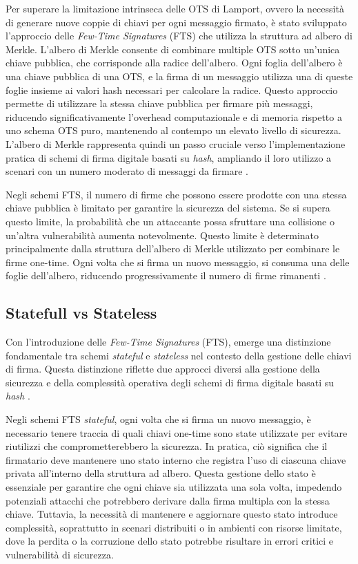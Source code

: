 Per superare la limitazione intrinseca delle OTS di Lamport, ovvero la necessità di generare nuove coppie di chiavi per ogni messaggio firmato, è stato sviluppato l'approccio delle \textit{Few-Time Signatures} (FTS) che utilizza la struttura ad albero di Merkle. L'albero di Merkle consente di combinare multiple OTS sotto un'unica chiave pubblica, che corrisponde alla radice dell'albero. Ogni foglia dell'albero è una chiave pubblica di una OTS, e la firma di un messaggio utilizza una di queste foglie insieme ai valori hash necessari per calcolare la radice. Questo approccio permette di utilizzare la stessa chiave pubblica per firmare più messaggi, riducendo significativamente l'overhead computazionale e di memoria rispetto a uno schema OTS puro, mantenendo al contempo un elevato livello di sicurezza. L'albero di Merkle rappresenta quindi un passo cruciale verso l'implementazione pratica di schemi di firma digitale basati su \textit{hash}, ampliando il loro utilizzo a scenari con un numero moderato di messaggi da firmare \cite{nature-pqc}.

Negli schemi FTS, il numero di firme che possono essere prodotte con una stessa chiave pubblica è limitato per garantire la sicurezza del sistema. Se si supera questo limite, la probabilità che un attaccante possa sfruttare una collisione o un'altra vulnerabilità aumenta notevolmente. Questo limite è determinato principalmente dalla struttura dell'albero di Merkle utilizzato per combinare le firme one-time. Ogni volta che si firma un nuovo messaggio, si consuma una delle foglie dell'albero, riducendo progressivamente il numero di firme rimanenti \cite{nature-pqc}.

\subsection{Statefull vs Stateless}

Con l'introduzione delle \textit{Few-Time Signatures} (FTS), emerge una distinzione fondamentale tra schemi \textit{stateful} e \textit{stateless} nel contesto della gestione delle chiavi di firma. Questa distinzione riflette due approcci diversi alla gestione della sicurezza e della complessità operativa degli schemi di firma digitale basati su \textit{hash} \cite{iot-hashbasedpqc}.

Negli schemi FTS  \textit{stateful}, ogni volta che si firma un nuovo messaggio, è necessario tenere traccia di quali chiavi one-time sono state utilizzate per evitare riutilizzi che comprometterebbero la sicurezza. In pratica, ciò significa che il firmatario deve mantenere uno stato interno che registra l'uso di ciascuna chiave privata all'interno della struttura ad albero. Questa gestione dello stato è essenziale per garantire che ogni chiave sia utilizzata una sola volta, impedendo potenziali attacchi che potrebbero derivare dalla firma multipla con la stessa chiave. Tuttavia, la necessità di mantenere e aggiornare questo stato introduce complessità, soprattutto in scenari distribuiti o in ambienti con risorse limitate, dove la perdita o la corruzione dello stato potrebbe risultare in errori critici e vulnerabilità di sicurezza.

